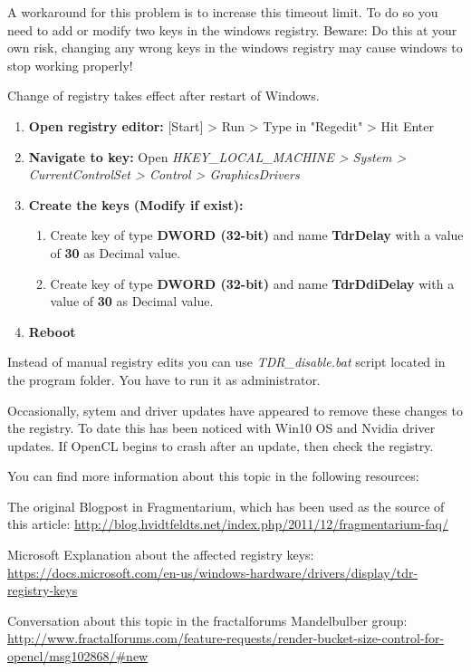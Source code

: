 A workaround for this problem is to increase this timeout limit. To do so you need to add or modify two keys in the windows registry. Beware: Do this at your own risk, changing any wrong keys in the windows registry may cause windows to stop working properly!

Change of registry takes effect after restart of Windows.

\begin{enumerate}
	
	\item \textbf{Open registry editor:} [Start] > Run > Type in "Regedit" > Hit Enter
	\item \textbf{Navigate to key:} Open \emph{HKEY\_LOCAL\_MACHINE > System > CurrentControlSet > Control > GraphicsDrivers}
	\item \textbf{Create the keys (Modify if exist):}
	\begin{enumerate}
		\item Create key of type \textbf{DWORD (32-bit)} and name \textbf{TdrDelay} with a value of \textbf{30} as Decimal value.
		\item Create key of type \textbf{DWORD (32-bit)} and name \textbf{TdrDdiDelay} with a value of \textbf{30} as Decimal value.	
	\end{enumerate}	
	\item \textbf{Reboot}

\end{enumerate}

Instead of manual registry edits you can use \emph{TDR\_disable.bat} script located in the program folder. You have to run it as administrator.

Occasionally, sytem and driver updates have appeared to remove these changes to the registry. To date this has been noticed with Win10 OS and Nvidia driver updates. If OpenCL begins to crash after an update, then check the registry.

You can find more information about this topic in the following resources:

The original Blogpost in Fragmentarium, which has been used as the source of this article: \url{http://blog.hvidtfeldts.net/index.php/2011/12/fragmentarium-faq/}

Microsoft Explanation about the affected registry keys: \url{https://docs.microsoft.com/en-us/windows-hardware/drivers/display/tdr-registry-keys}

Conversation about this topic in the fractalforums Mandelbulber group:
\url{http://www.fractalforums.com/feature-requests/render-bucket-size-control-for-opencl/msg102868/#new}

